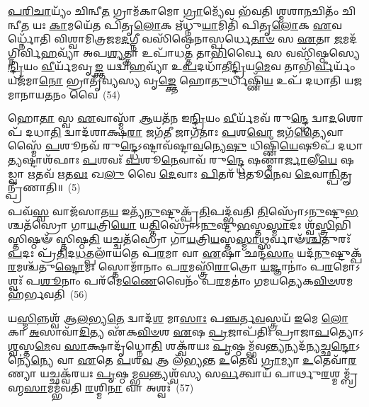 \-\ul{𑌪}\-\-\ul{𑌰𑌿}\-\-\ul{𑌚𑌾}\-𑌯𑍍𑌯𑌂᳴ 𑌚𑌿𑌨𑍍𑌵𑍀\-\ul{𑌤} 𑌗𑍍𑌰𑌾𑌮᳴𑌕𑌾𑌮𑍋 \ul{𑌗𑍍𑌰𑌾}\-𑌮𑍍𑌯𑍇᳴𑌵 𑌭᳴𑌵𑌤𑌿 𑌶𑍍𑌮𑌶𑌾\-\ul{𑌨}\-𑌚𑌿𑌤𑌂᳴ 𑌚𑌿𑌨𑍍𑌵𑍀\-\ul{𑌤} 𑌯𑌃 \ul{𑌕𑌾}\-𑌮𑌯𑍇᳴𑌤 𑌪𑌿𑌤𑍃\-\ul{𑌲𑍋}\-𑌕 𑌋᳴𑌧𑍍𑌨𑍁\-\ul{𑌯𑌾}\-𑌮𑌿𑌤𑌿᳴ 𑌪𑌿𑌤𑍃\-\ul{𑌲𑍋}\-𑌕 \ul{𑌏}\-𑌵𑌰𑍍𑌧𑍍𑌨𑍋᳴𑌤𑌿 𑌵𑌿𑌶𑍍𑌵𑌾𑌮𑌿𑌤𑍍𑌰𑌜𑌮\-\ul{𑌦}\-𑌗𑍍𑌨𑍀 𑌵𑌸𑌿᳴𑌷𑍍𑌠𑍇𑌨𑌾𑌸𑍍𑌪𑌰𑍍𑌧𑍇\-\ul{𑌤𑌾}\-\-\ul{𑍞} 𑌸 \ul{𑌏}\-𑌤𑌾 \ul{𑌜}\-𑌮𑌦᳴𑌗𑍍𑌨𑌿𑌰𑍍𑌵𑌿\-\ul{𑌹}\-𑌵𑍍𑌯𑌾᳴ 𑌅𑌪\-\ul{𑌶𑍍𑌯}\-𑌤𑍍𑌤𑌾 𑌉𑌪𑌾᳴𑌧\-\ul{𑌤𑍍𑌤} 𑌤𑌾\-\ul{𑌭𑌿}\-𑌰𑍍𑌵𑍈 𑌸 𑌵𑌸𑌿᳴𑌷𑍍𑌠𑌸𑍍𑌯𑍇\-\ul{𑌨𑍍𑌦𑍍𑌰𑌿}\-𑌯𑌂 \ul{𑌵𑍀}\-𑌰𑍍𑌯᳴𑌮𑌵𑍃\-\ul{𑌙𑍍𑌕𑍍𑌤} 𑌯𑌦𑍍𑌵𑌿᳴\-\ul{𑌹}\-𑌵𑍍𑌯𑌾᳴ 𑌉\-\ul{𑌪}\-𑌦𑌧𑌾᳴𑌤𑍀\-\ul{𑌨𑍍𑌦𑍍𑌰𑌿}\-𑌯\-\ul{𑌮𑍇}\-𑌵 𑌤𑌾𑌭𑌿᳴\-\ul{𑌰𑍍𑌵𑍀}\-𑌰𑍍𑌯𑌂᳴ 𑌯𑌜᳴𑌮𑌾\-\ul{𑌨𑍋} 𑌭𑍍𑌰𑌾𑌤𑍃᳴𑌵𑍍𑌯𑌸𑍍𑌯 𑌵𑍃\-\ul{𑌙𑍍𑌕𑍍𑌤𑍇} 𑌹𑍋\-\ul{𑌤𑍁}\-𑌰𑍍𑌧𑌿𑌷𑍍𑌣𑌿᳴\-\ul{𑌯} 𑌉𑌪᳴ 𑌦𑌧𑌾𑌤𑌿 𑌯𑌜𑌮𑌾𑌨𑌾𑌯\-\ul{𑌤}\-𑌨𑌂 𑌵𑍈~(54)

𑌹𑍋\-\ul{𑌤𑌾} 𑌸𑍍𑌵 \ul{𑌏}\-𑌵𑌾𑌸𑍍𑌮𑌾᳴ \ul{𑌆}\-𑌯𑌤᳴𑌨 𑌇\-\ul{𑌨𑍍𑌦𑍍𑌰𑌿}\-𑌯𑌂 \ul{𑌵𑍀}\-𑌰𑍍𑌯᳴𑌮𑌵᳴ 𑌰𑍁\-\ul{𑌨𑍍𑌦𑍍𑌧𑍇} 𑌦𑍍𑌵𑌾\-\ul{𑌦}\-𑌶𑍋𑌪᳴ 𑌦𑌧𑌾\-\ul{𑌤𑌿} 𑌦𑍍𑌵𑌾𑌦᳴𑌶𑌾𑌕𑍍𑌷\-\ul{𑌰𑌾} 𑌜𑌗᳴\-\ul{𑌤𑍀} 𑌜𑌾𑌗᳴𑌤𑌾𑌃 \ul{𑌪}\-𑌶\-\ul{𑌵𑍋} 𑌜𑌗᳴\-\ul{𑌤𑍍𑌯𑍈}\-𑌵𑌾𑌸𑍍𑌮𑍈᳴ \ul{𑌪}\-𑌶𑍂𑌨𑌵᳴ 𑌰𑍁\-\ul{𑌨𑍍𑌦𑍍𑌧𑍇}\-\-𑌽𑌷𑍍𑌟𑌾𑌵᳴𑌷𑍍𑌟𑌾\-\ul{𑌵}\-𑌨𑍍𑌯𑍇\-\ul{𑌷𑍁} 𑌧𑌿𑌷𑍍𑌣𑌿᳴\-\ul{𑌯𑍇}\-𑌷𑍂𑌪᳴ 𑌦𑌧𑌾\-\ul{𑌤𑍍𑌯}\-𑌷𑍍𑌟𑌾𑌶᳴𑌫𑌾𑌃 \ul{𑌪}\-𑌶𑌵𑌃᳴ \ul{𑌪}\-𑌶𑍂\-\ul{𑌨𑍇}\-𑌵𑌾𑌵᳴ 𑌰𑍁\-\ul{𑌨𑍍𑌦𑍍𑌧𑍇} 𑌷𑌣𑍍𑌮𑌾॑\-\ul{𑌰𑍍𑌜𑌾}\-𑌲𑍀\-\ul{𑌯𑍇} 𑌷𑌡𑍍𑌵𑌾 \ul{𑌋}\-𑌤𑌵᳴ \ul{𑌋}\-𑌤\-\ul{𑌵𑌃} 𑌖\-\ul{𑌲𑍁} 𑌵𑍈 \ul{𑌦𑍇}\-𑌵𑌾𑌃 \ul{𑌪𑌿}\-𑌤𑌰᳴ \ul{𑌋}\-𑌤𑍂\-\ul{𑌨𑍇}\-𑌵 \ul{𑌦𑍇}\-𑌵𑌾\-\ul{𑌨𑍍𑌪𑌿}\-𑌤𑍄𑌨𑍍𑌪𑍍𑌰𑍀᳴𑌣𑌾𑌤𑌿॥~(5)

{}%

𑌪𑌵᳴\-\ul{𑌸𑍍𑌵} 𑌵𑌾𑌜᳴𑌸𑌾𑌤\-\ul{𑌯} 𑌇𑌤𑍍𑌯᳴\-\ul{𑌨𑍁}\-𑌷𑍍𑌟𑍁𑌕𑍍𑌪𑍍𑌰᳴\-\ul{𑌤𑌿}\-𑌪𑌦𑍍𑌭᳴𑌵𑌤𑌿 \ul{𑌤𑌿}\-𑌸𑍍𑌰𑍋᳴\-𑌽\-\ul{𑌨𑍁}\-𑌷𑍍𑌟𑍁\-\ul{𑌭}\-𑌶𑍍𑌚𑌤᳴𑌸𑍍𑌰𑍋 𑌗𑌾\-\ul{𑌯}\-𑌤𑍍𑌰𑌿\-\ul{𑌯𑍋} 𑌯\-\ul{𑌤𑍍𑌤𑌿}\-𑌸𑍍𑌰𑍋᳴\-𑌽\-\ul{𑌨𑍁}\-𑌷𑍍𑌟𑍁\-\ul{𑌭}\-𑌸𑍍𑌤\-\ul{𑌸𑍍𑌮𑌾}\-𑌦𑌃 𑌶𑍍𑌵᳴\-\ul{𑌸𑍍𑌤𑍍𑌰𑌿}\-𑌭𑌿𑌸𑍍𑌤𑌿𑌷𑍍𑌠𑍟᳴ 𑌸𑍍𑌤𑌿𑌷𑍍𑌠\-\ul{𑌤𑌿} 𑌯𑌚𑍍𑌚𑌤᳴𑌸𑍍𑌰𑍋 𑌗𑌾\-\ul{𑌯}\-𑌤𑍍𑌰𑌿\-\ul{𑌯}\-𑌸𑍍𑌤\-\ul{𑌸𑍍𑌮𑌾}\-𑌥𑍍𑌸𑌰𑍍𑌵𑌾𑍟᳴\-\ul{𑌶𑍍𑌚}\-𑌤𑍁𑌰𑌃᳴ \ul{𑌪}\-𑌦𑌃 𑌪𑍍𑌰᳴\-\ul{𑌤𑌿}\-𑌦\-\ul{𑌧}\-𑌤𑍍𑌪𑌲𑌾᳴𑌯𑌤𑍇 𑌪\-\ul{𑌰}\-𑌮𑌾 𑌵𑌾 \ul{𑌏}\-𑌷𑌾 𑌛𑌨𑍍𑌦᳴\-\ul{𑌸𑌾𑌂} 𑌯𑌦᳴\-\ul{𑌨𑍁}\-𑌷𑍍𑌟𑍁𑌕𑍍𑌪᳴\-\ul{𑌰}\-𑌮𑌶𑍍𑌚᳴𑌤𑍁\-\ul{𑌷𑍍𑌟𑍋}\-𑌮𑌃 𑌸𑍍𑌤𑍋𑌮𑌾᳴𑌨𑌾𑌂 𑌪\-\ul{𑌰}\-𑌮𑌸𑍍𑌤𑍍𑌰𑌿᳴\-\ul{𑌰𑌾}\-𑌤𑍍𑌰𑍋 \ul{𑌯}\-𑌜𑍍𑌞𑌾𑌨𑌾𑌂॑ 𑌪\-\ul{𑌰}\-𑌮𑍋\-𑌽𑌶𑍍𑌵𑌃᳴ 𑌪\-\ul{𑌶𑍂}\-𑌨𑌾𑌂 𑌪𑌰᳴𑌮𑍇\-\ul{𑌣𑍈}\-𑌵𑍈𑌨𑌂᳴ 𑌪\-\ul{𑌰}\-𑌮𑌤𑌾𑌂॑ 𑌗𑌮𑌯𑌤𑍍𑌯𑍇𑌕\-\ul{𑌵𑌿}\-\-\ul{𑍞}\-𑌶𑌮𑌹᳴𑌰𑍍𑌭𑌵𑌤𑌿~(56)

𑌯\-\ul{𑌸𑍍𑌮𑌿}\-𑌨𑍍𑌨𑌶𑍍𑌵᳴ 𑌆\-\ul{𑌲}\-𑌭𑍍𑌯\-\ul{𑌤𑍇} 𑌦𑍍𑌵𑌾𑌦᳴\-\ul{𑌶} 𑌮𑌾\-\ul{𑌸𑌾𑌃} 𑌪\-\ul{𑌞𑍍𑌚}\-𑌰𑍍𑌤\-\ul{𑌵}\-𑌸𑍍𑌤𑍍𑌰𑌯᳴ \ul{𑌇}\-𑌮𑍇 \ul{𑌲𑍋}\-𑌕𑌾 \ul{𑌅}\-𑌸𑌾𑌵𑌾᳴\-\ul{𑌦𑌿}\-𑌤𑍍𑌯 𑌏᳴𑌕\-\ul{𑌵𑌿}\-\-\ul{𑍞}\-𑌶 \ul{𑌏}\-𑌷 \ul{𑌪𑍍𑌰}\-𑌜𑌾𑌪᳴𑌤𑌿𑌃 𑌪𑍍𑌰𑌾𑌜𑌾\-\ul{𑌪}\-𑌤𑍍𑌯𑍋\-𑌽\-\ul{𑌶𑍍𑌵}\-𑌸𑍍𑌤\-\ul{𑌮𑍇}\-𑌵 \ul{𑌸𑌾}\-𑌕𑍍𑌷𑌾𑌦𑍃᳴𑌧𑍍𑌨𑍋\-\ul{𑌤𑌿} 𑌶𑌕𑍍𑌵᳴𑌰𑌯𑌃 \ul{𑌪𑍃}\-𑌷𑍍𑌠𑌮𑍍𑌭᳴𑌵\-\ul{𑌨𑍍𑌤𑍍𑌯}\-𑌨𑍍𑌯𑌦᳴\-\ul{𑌨𑍍𑌯}\-𑌚𑍍𑌛\-\ul{𑌨𑍍𑌦𑍋}\-\-𑌽𑌨𑍍𑌯𑍇॑\-\ul{𑌨𑍍𑌯𑍇} 𑌵𑌾 \ul{𑌏}\-𑌤𑍇 \ul{𑌪}\-𑌶\-\ul{𑌵} 𑌆 𑌲᳴𑌭𑍍𑌯𑌨𑍍𑌤 \ul{𑌉}\-𑌤𑍇𑌵᳴ \ul{𑌗𑍍𑌰𑌾}\-𑌮𑍍𑌯𑌾 \ul{𑌉}\-𑌤𑍇𑌵𑌾᳴\-\ul{𑌰}\-𑌣𑍍𑌯𑌾 𑌯𑌚𑍍𑌛𑌕𑍍𑌵᳴𑌰𑌯𑌃 \ul{𑌪𑍃}\-𑌷𑍍𑌠𑌮𑍍𑌭\-\ul{𑌵}\-𑌨𑍍𑌤𑍍𑌯𑌶𑍍𑌵᳴𑌸𑍍𑌯 𑌸\-\ul{𑌰𑍍𑌵}\-𑌤𑍍𑌵𑌾𑌯᳴ 𑌪𑌾𑌰𑍍𑌥𑍁\-\ul{𑌰}\-𑌶𑍍𑌮𑌮𑍍𑌬𑍍𑌰᳴𑌹𑍍𑌮\-\ul{𑌸𑌾}\-𑌮𑌮𑍍𑌭᳴𑌵𑌤𑌿 \ul{𑌰}\-𑌶𑍍𑌮𑌿\-\ul{𑌨𑌾} 𑌵𑌾 𑌅𑌶𑍍𑌵𑌃᳴~(57)

